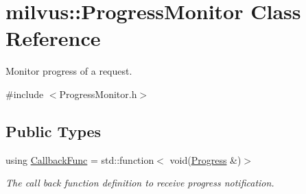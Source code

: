 \hypertarget{classmilvus_1_1_progress_monitor}{}\section{milvus\+:\+:Progress\+Monitor Class Reference}
\label{classmilvus_1_1_progress_monitor}


Monitor progress of a request.  




{\ttfamily \#include $<$Progress\+Monitor.\+h$>$}

\subsection*{Public Types}
\begin{DoxyCompactItemize}
\item 
\mbox{\label{classmilvus_1_1_progress_monitor_a8d463fa6891b76c10e1088294f64d81f}} 
using \hyperlink{classmilvus_1_1_progress_monitor_a8d463fa6891b76c10e1088294f64d81f}{Callback\+Func} = std\+::function$<$ void(\hyperlink{structmilvus_1_1_progress}{Progress} \&)$>$
\begin{DoxyCompactList}\small\item\em The call back function definition to receive progress notification. \end{DoxyCompactList}\end{DoxyCompactItemize}
